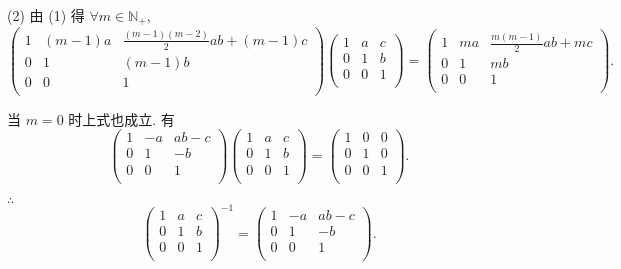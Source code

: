 \documentclass[color=black,device=normal,lang=cn,mode=geye]{elegantnote}
\begin{document}
\begin{solution}
    (2) 由 (1) 得 $\forall m\in\mathbb{N}_+$,
    \[\begin{pmatrix}
        1 & (m-1)a & \frac{(m-1)(m-2)}{2}ab+(m-1)c \\
        0 & 1 & (m-1)b \\
        0 & 0 & 1 \\
    \end{pmatrix}\begin{pmatrix}
        1 & a & c \\
        0 & 1 & b \\
        0 & 0 & 1 \\
    \end{pmatrix}=\begin{pmatrix}
        1 & ma & \frac{m(m-1)}{2}ab+mc \\
        0 & 1 & mb \\
        0 & 0 & 1 \\
    \end{pmatrix}.\]

    当 $m=0$ 时上式也成立. 有
    \[\begin{pmatrix}
        1 & -a & ab-c \\
        0 & 1 & -b \\
        0 & 0 & 1 \\
    \end{pmatrix}\begin{pmatrix}
        1 & a & c \\
        0 & 1 & b \\
        0 & 0 & 1 \\
    \end{pmatrix}=\begin{pmatrix}
        1 & 0 & 0 \\
        0 & 1 & 0 \\
        0 & 0 & 1 \\
    \end{pmatrix}.\]

    $\therefore$
    \[\begin{pmatrix}
        1 & a & c \\
        0 & 1 & b \\
        0 & 0 & 1 \\
    \end{pmatrix}^{-1}=\begin{pmatrix}
        1 & -a & ab-c \\
        0 & 1 & -b \\
        0 & 0 & 1 \\
    \end{pmatrix}.\]
\end{solution}
\end{document}
